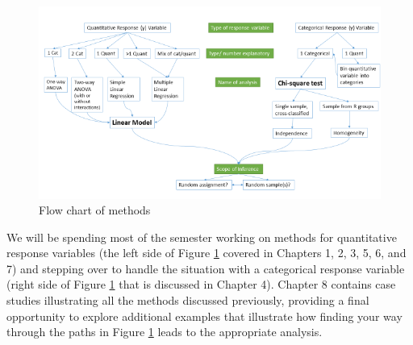 \documentclass[]{book}
\begin{document}
\begin{figure}
\includegraphics[width=8.89in]{chapter0_files/image001} \caption{Flow chart of methods}\label{fig:Figure1}
\end{figure}

We will be spending most of the semester working on methods for
quantitative response variables (the left side of Figure
\ref{fig:Figure1} covered in Chapters 1, 2, 3, 5, 6, and 7) and stepping
over to handle the situation with a categorical response variable (right
side of Figure \ref{fig:Figure1} that is discussed in Chapter 4).
Chapter 8 contains case studies illustrating all the methods discussed
previously, providing a final opportunity to explore additional examples
that illustrate how finding your way through the paths in Figure
\ref{fig:Figure1} leads to the appropriate analysis.
\end{document}
